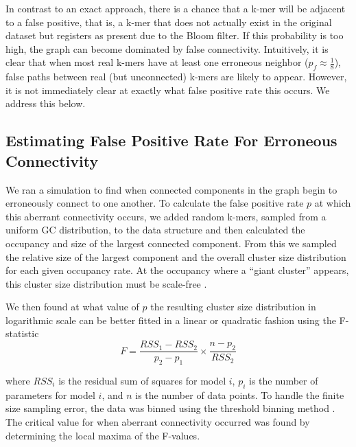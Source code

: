 \documentclass[12pt]{article} \usepackage{simplemargins}
\begin{document}
In contrast to an exact approach, there is a chance that a k-mer 
will be adjacent to a false positive,
that is, a k-mer
that does not actually exist in the original dataset but registers as present  
due to 
the Bloom filter. If this probability is too high, the 
graph can become dominated by false connectivity. 
Intuitively, it is clear that when most real k-mers
have at least one erroneous neighbor ($p_f \approx \frac{1}{8}$), 
false paths between real (but unconnected) k-mers are likely to 
appear. However, it is not immediately clear at exactly what 
false positive rate this occurs. We address this below.  %

\subsection{Estimating False Positive Rate For Erroneous Connectivity}
We ran a simulation to find when connected components in the graph 
begin to erroneously connect to one another.
To calculate the false positive rate $p$ at which this aberrant 
connectivity occurs, 
we added random k-mers, sampled from a uniform GC distribution, to the data structure 
and then calculated the occupancy and size of 
the largest connected 
component. From this we sampled the relative size of 
the largest component and the overall cluster size distribution for each
given occupancy rate.
At the occupancy where a ``giant cluster'' appears, this cluster size distribution 
must be scale-free \cite{stauffer1979scaling}. 

We then found at what value of $p$ the resulting 
cluster size distribution in logarithmic 
scale can be better fitted in a linear or quadratic fashion using 
the F-statistic
\newline
\newline
\begin{displaymath}
F=\frac{RSS_1-RSS_2}{p_2-p_1} \times \frac{n - p_2}{RSS_2}
\end{displaymath}

where $RSS_i$ is the residual sum of squares for model $i$, $p_i$ is 
the number of parameters for model $i$, and $n$ is the number of data 
points. To handle the finite size sampling error, the data was binned using the 
threshold binning method \cite{adami2002critical}. The critical value for 
when aberrant connectivity occurred was found by determining the local maxima 
of the F-values.
\end{document}
